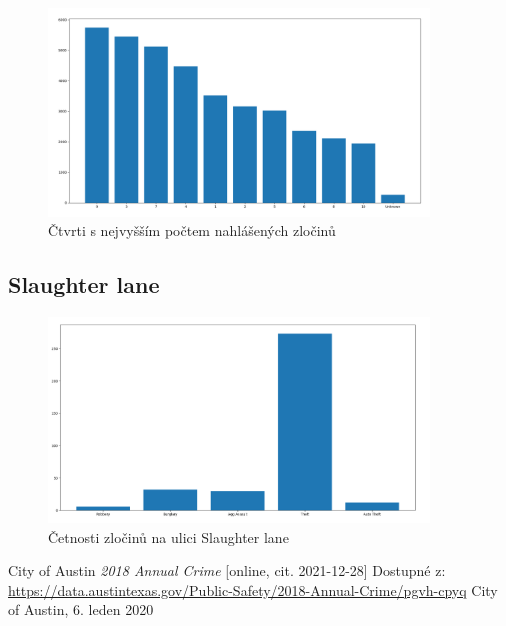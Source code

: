 \documentclass{article}
\begin{document}
\begin{figure}
  \centering
  \includegraphics[width=0.9\textwidth]{figures/worst_districts.png}
  \caption{Čtvrti s nejvyšším počtem nahlášených zločinů}
\end{figure}

\subsection{Slaughter lane}

\begin{figure}
  \centering
  \includegraphics[width=0.9\textwidth]{figures/slaughter_lane.png}
  \caption{Četnosti zločinů na ulici Slaughter lane}
\end{figure}

\begin{thebibliography}{50}

City of Austin \textit{2018 Annual Crime} [online, cit. 2021-12-28]
Dostupné z: \url{https://data.austintexas.gov/Public-Safety/2018-Annual-Crime/pgvh-cpyq} 
City of Austin, 6. leden 2020

\end{thebibliography}
\end{document}
